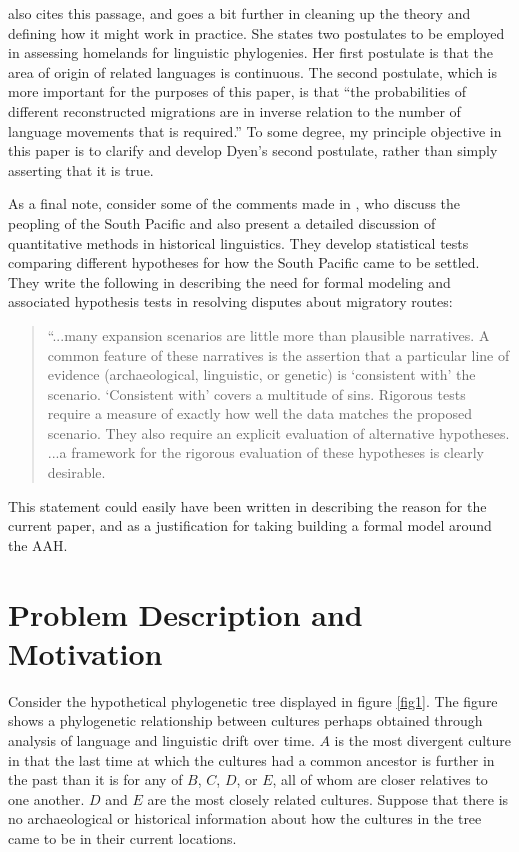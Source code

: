 \documentclass[11pt]{article}
\begin{document}
\citet[p. 623]{dyen56} also cites this passage, and goes a bit further in cleaning up the theory and defining how it might work  in practice. She states two postulates to be employed in assessing homelands for linguistic phylogenies. Her first postulate is that the area of origin of related languages is continuous. The second postulate, which is more important for the purposes of this paper, is that ``the probabilities of different reconstructed migrations are in inverse relation to the number of language movements that is required.'' \citep[p.613]{dyen56} 
To some degree, my principle objective in this paper is to clarify and develop Dyen's second postulate, rather than simply asserting that it is true.

As a final note, consider some of the comments made in \cite{greenhill05}, who discuss the peopling of the South Pacific and also present a detailed discussion of quantitative methods in historical linguistics. They develop statistical tests comparing different hypotheses for how the South Pacific came to be settled. They write the following in describing the need for formal modeling and associated hypothesis tests in resolving disputes about migratory routes:

\begin{quote}
``...many expansion scenarios are little more than plausible narratives. A common feature of these narratives is the assertion that a particular line of evidence (archaeological, linguistic, or genetic) is `consistent with' the scenario. `Consistent with' covers a multitude of sins. Rigorous tests require a measure of exactly how well the data matches the proposed scenario. They also require an explicit evaluation of alternative hypotheses. ...a framework for the rigorous evaluation of these hypotheses is clearly desirable. \citep[p. 31]{greenhill05} 
\end{quote}
This statement could easily have been written in describing the reason for the current paper, and as a justification for taking building a formal model around the AAH.

\section{Problem Description and Motivation}

Consider the hypothetical phylogenetic tree displayed in figure \ref{fig1}. The figure shows a phylogenetic relationship between cultures perhaps obtained through analysis of language and linguistic drift over time. $A$ is the most divergent culture in that the last time at which the cultures had a common ancestor is further in the past than it is for any of $B$, $C$, $D$, or $E$, all of whom are closer relatives to one another. $D$ and $E$ are the most closely related cultures. Suppose that there is no archaeological or historical information about how the cultures in the tree came to be in their current locations.
\end{document}
